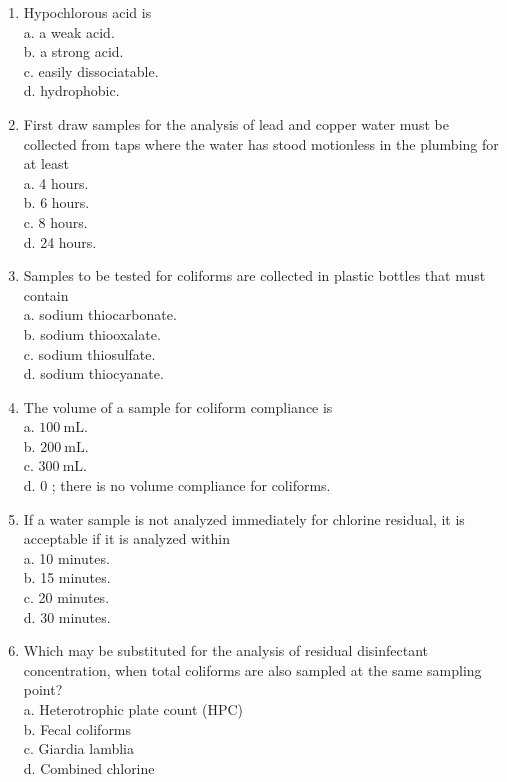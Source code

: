 \documentclass[10pt]{article}
\begin{document}
\begin{enumerate}
\item Hypochlorous acid is\\
a. a weak acid.\\
b. a strong acid.\\
c. easily dissociatable.\\
d. hydrophobic.

  \item First draw samples for the analysis of lead and copper water must be collected from taps where the water has stood motionless in the plumbing for at least\\
a. 4 hours.\\
b. 6 hours.\\
c. 8 hours.\\
d. 24 hours.

  \item Samples to be tested for coliforms are collected in plastic bottles that must contain\\
a. sodium thiocarbonate.\\
b. sodium thiooxalate.\\
c. sodium thiosulfate.\\
d. sodium thiocyanate.

  \item The volume of a sample for coliform compliance is\\
a. $100 \mathrm{~mL}$.\\
b. $200 \mathrm{~mL}$.\\
c. $300 \mathrm{~mL}$.\\
d. 0 ; there is no volume compliance for coliforms.

  \item If a water sample is not analyzed immediately for chlorine residual, it is acceptable if it is analyzed within\\
a. 10 minutes.\\
b. 15 minutes.\\
c. 20 minutes.\\
d. 30 minutes.

  \item Which may be substituted for the analysis of residual disinfectant concentration, when total coliforms are also sampled at the same sampling point?\\
a. Heterotrophic plate count (HPC)\\
b. Fecal coliforms\\
c. Giardia lamblia\\
d. Combined chlorine


\end{enumerate}
\end{document}
